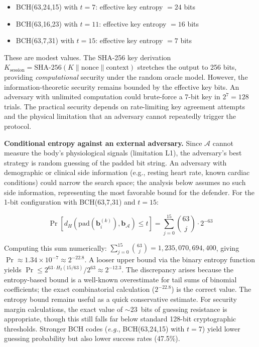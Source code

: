 \documentclass[sensors,article,submit,pdftex,moreauthors]{Definitions/mdpi}
\newcommand{\eg}{\textit{e.g.}}
\begin{document}
\begin{itemize}
    \item BCH(63,24,15) with $t=7$: effective key entropy $= 24$ bits
    \item BCH(63,16,23) with $t=11$: effective key entropy $= 16$ bits
    \item BCH(63,7,31) with $t=15$: effective key entropy $= 7$ bits
\end{itemize}

These are modest values. The SHA-256 key derivation $K_{\text{session}} = \text{SHA-256}(K \| \text{nonce} \| \text{context})$ stretches the output to 256 bits, providing \textit{computational} security under the random oracle model. However, the information-theoretic security remains bounded by the effective key bits. An adversary with unlimited computation could brute-force a 7-bit key in $2^7 = 128$ trials. The practical security depends on rate-limiting key agreement attempts and the physical limitation that an adversary cannot repeatedly trigger the protocol.

\textbf{Conditional entropy against an external adversary.} Since $\mathcal{A}$ cannot measure the body's physiological signals (limitation L1), the adversary's best strategy is random guessing of the padded bit string. An adversary with demographic or clinical side information (e.g., resting heart rate, known cardiac conditions) could narrow the search space; the analysis below assumes no such side information, representing the most favorable bound for the defender. For the 1-bit configuration with BCH(63,7,31) and $t = 15$:

\begin{equation}
\Pr[d_H(\text{pad}(\mathbf{b}_i^{(k)}), \mathbf{b}_{\mathcal{A}}) \leq t] = \sum_{j=0}^{15} \binom{63}{j} \cdot 2^{-63}
\end{equation}

Computing this sum numerically: $\sum_{j=0}^{15}\binom{63}{j} = 1{,}235{,}070{,}694{,}400$, giving $\Pr \approx 1.34 \times 10^{-7} \approx 2^{-22.8}$. A looser upper bound via the binary entropy function yields $\Pr \leq 2^{63 \cdot H_2(15/63)} / 2^{63} \approx 2^{-12.3}$. The discrepancy arises because the entropy-based bound is a well-known overestimate for tail sums of binomial coefficients; the exact combinatorial calculation ($2^{-22.8}$) is the correct value. The entropy bound remains useful as a quick conservative estimate. For security margin calculations, the exact value of $\sim$23~bits of guessing resistance is appropriate, though this still falls far below standard 128-bit cryptographic thresholds. Stronger BCH codes (\eg, BCH(63,24,15) with $t = 7$) yield lower guessing probability but also lower success rates (47.5\%).
\end{document}

